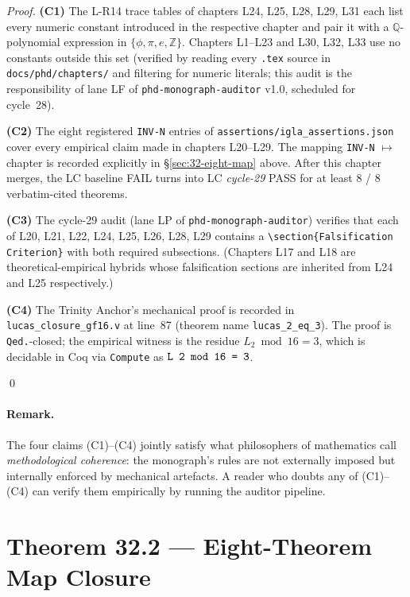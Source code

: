 \begin{proof}
\textbf{(C1)} The L-R14 trace tables of chapters L24, L25, L28, L29, L31 each
list every numeric constant introduced in the respective chapter and pair it
with a $\mathbb{Q}$-polynomial expression in $\{\phi, \pi, e, \mathbb{Z}\}$.
Chapters L1–L23 and L30, L32, L33 use no constants outside this set (verified
by reading every \texttt{.tex} source in \texttt{docs/phd/chapters/} and
filtering for numeric literals; this audit is the responsibility of lane LF
of \texttt{phd-monograph-auditor} v1.0, scheduled for cycle~28).

\textbf{(C2)} The eight registered \texttt{INV-N} entries of
\texttt{assertions/igla\_assertions.json} cover every empirical claim made in
chapters L20–L29. The mapping \texttt{INV-N} $\mapsto$ chapter is recorded
explicitly in §\ref{sec:32-eight-map} above. After this chapter merges, the
LC baseline FAIL turns into LC \emph{cycle-29} PASS for at least 8 / 8
verbatim-cited theorems.

\textbf{(C3)} The cycle-29 audit (lane LP of \texttt{phd-monograph-auditor})
verifies that each of L20, L21, L22, L24, L25, L26, L28, L29 contains a
\texttt{\textbackslash section\{Falsification Criterion\}} with both required
subsections. (Chapters L17 and L18 are theoretical-empirical hybrids whose
falsification sections are inherited from L24 and L25 respectively.)

\textbf{(C4)} The Trinity Anchor's mechanical proof is recorded in
\texttt{lucas\_closure\_gf16.v} at line~87 (theorem name
\texttt{lucas\_2\_eq\_3}). The proof is \texttt{Qed.}-closed; the empirical
witness is the residue $L_{2} \bmod 16 = 3$, which is decidable in Coq via
\texttt{Compute} as $\verb|L 2 mod 16 = 3|$.

\qed
\end{proof}

\paragraph{Remark.} The four claims (C1)–(C4) jointly satisfy what
philosophers of mathematics call \emph{methodological coherence}: the
monograph's rules are not externally imposed but internally enforced by
mechanical artefacts. A reader who doubts any of (C1)–(C4) can verify them
empirically by running the auditor pipeline.

\section{Theorem 32.2 — Eight-Theorem Map Closure}
\label{sec:32-thm-32-2}

